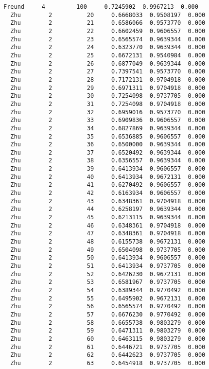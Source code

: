 \documentclass[11pt]{article}
\begin{document}
\begin{Verbatim}[commandchars=\\\{\}]
  Freund     4         100     0.7245902  0.9967213  0.000
  Zhu        2          20     0.6668033  0.9508197  0.000
  Zhu        2          21     0.6586066  0.9573770  0.000
  Zhu        2          22     0.6602459  0.9606557  0.000
  Zhu        2          23     0.6565574  0.9639344  0.000
  Zhu        2          24     0.6323770  0.9639344  0.000
  Zhu        2          25     0.6672131  0.9540984  0.000
  Zhu        2          26     0.6877049  0.9639344  0.000
  Zhu        2          27     0.7397541  0.9573770  0.000
  Zhu        2          28     0.7172131  0.9704918  0.000
  Zhu        2          29     0.6971311  0.9704918  0.000
  Zhu        2          30     0.7254098  0.9737705  0.000
  Zhu        2          31     0.7254098  0.9704918  0.000
  Zhu        2          32     0.6959016  0.9573770  0.000
  Zhu        2          33     0.6909836  0.9606557  0.000
  Zhu        2          34     0.6827869  0.9639344  0.000
  Zhu        2          35     0.6536885  0.9606557  0.000
  Zhu        2          36     0.6500000  0.9639344  0.000
  Zhu        2          37     0.6520492  0.9639344  0.000
  Zhu        2          38     0.6356557  0.9639344  0.000
  Zhu        2          39     0.6413934  0.9606557  0.000
  Zhu        2          40     0.6413934  0.9672131  0.000
  Zhu        2          41     0.6270492  0.9606557  0.000
  Zhu        2          42     0.6163934  0.9606557  0.000
  Zhu        2          43     0.6348361  0.9704918  0.000
  Zhu        2          44     0.6258197  0.9639344  0.000
  Zhu        2          45     0.6213115  0.9639344  0.000
  Zhu        2          46     0.6348361  0.9704918  0.000
  Zhu        2          47     0.6348361  0.9704918  0.000
  Zhu        2          48     0.6155738  0.9672131  0.000
  Zhu        2          49     0.6504098  0.9737705  0.000
  Zhu        2          50     0.6413934  0.9606557  0.000
  Zhu        2          51     0.6413934  0.9737705  0.000
  Zhu        2          52     0.6426230  0.9672131  0.000
  Zhu        2          53     0.6581967  0.9737705  0.000
  Zhu        2          54     0.6389344  0.9770492  0.000
  Zhu        2          55     0.6495902  0.9672131  0.000
  Zhu        2          56     0.6565574  0.9770492  0.000
  Zhu        2          57     0.6676230  0.9770492  0.000
  Zhu        2          58     0.6655738  0.9803279  0.000
  Zhu        2          59     0.6471311  0.9803279  0.000
  Zhu        2          60     0.6463115  0.9803279  0.000
  Zhu        2          61     0.6446721  0.9737705  0.000
  Zhu        2          62     0.6442623  0.9737705  0.000
  Zhu        2          63     0.6454918  0.9737705  0.000

\end{Verbatim}
\end{document}
